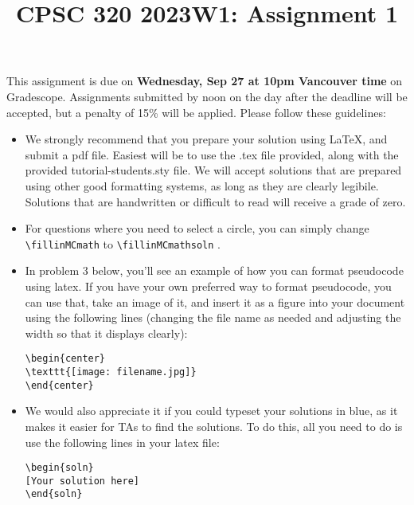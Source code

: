 \documentclass[11pt]{article}
\author{}
\date{}
\newcommand{\fillinMCmath}[1]{\begin{tikzpicture}\draw circle [radius=0.5em];\end{tikzpicture}\ #1}
\newcommand{\fillinMCmathsoln}[1]{\begin{tikzpicture}\draw[black, fill=blue] circle [radius=0.5em];\end{tikzpicture}\ #1}
\begin{document}
\title{CPSC 320 2023W1: Assignment 1}

\maketitle
\vspace{-0.5in}

This assignment is due on \textbf{Wednesday, Sep 27 at 10pm Vancouver time} on Gradescope. Assignments submitted by noon on the day after the deadline will be accepted, but a penalty of 15\% will be applied. Please follow these guidelines:

\begin{itemize}
\item
We strongly recommend that you prepare your solution using \LaTeX, and submit a
pdf file.  Easiest will be to use the .tex file provided, along with the
provided tutorial-students.sty file.
We will accept
solutions that are prepared using other good formatting systems, as
long as they are clearly legibile. Solutions that are handwritten or
difficult to read will receive a grade of zero.

\item
  For
questions where you need to select a circle, you can simply change
\verb~\fillinMCmath~ to \verb~\fillinMCmathsoln~ .
\item
In problem 3 below, you'll see an example of how you can format pseudocode using latex. If you have your own preferred way to format pseudocode, you can use that, take an image of it, and insert it as a figure into your document using the following lines (changing the file name as needed and adjusting the width so that it displays clearly):

\begin{verbatim}
\begin{center}
\texttt{[image: filename.jpg]}
\end{center}
\end{verbatim}

\item
  We would also appreciate it if you could typeset your solutions in blue, as it makes it easier for TAs to find the solutions. To do this, all you need to do is use the following lines in your latex file:

\begin{verbatim}
\begin{soln}
[Your solution here]
\end{soln}
\end{verbatim}


\end{itemize}
\end{document}
